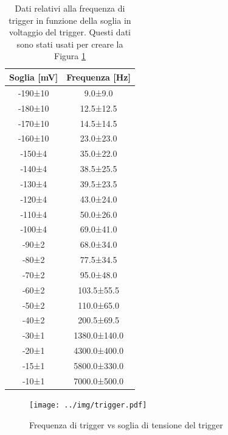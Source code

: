 \documentclass[10pt,a4paper]{article}
\begin{document}
\begin{table}[h]
    \centering
\begin{tabular}{c|c}
Soglia [mV] & Frequenza [Hz] \\
\midrule
-190±10 &      9.0±9.0 \\
-180±10 &    12.5±12.5 \\
-170±10 &    14.5±14.5 \\
-160±10 &    23.0±23.0 \\
 -150±4 &    35.0±22.0 \\
 -140±4 &    38.5±25.5 \\
 -130±4 &    39.5±23.5 \\
 -120±4 &    43.0±24.0 \\
 -110±4 &    50.0±26.0 \\
 -100±4 &    69.0±41.0 \\
  -90±2 &    68.0±34.0 \\
  -80±2 &    77.5±34.5 \\
  -70±2 &    95.0±48.0 \\
  -60±2 &   103.5±55.5 \\
  -50±2 &   110.0±65.0 \\
  -40±2 &   200.5±69.5 \\
  -30±1 & 1380.0±140.0 \\
  -20±1 & 4300.0±400.0 \\
  -15±1 & 5800.0±330.0 \\
  -10±1 & 7000.0±500.0 \\
\end{tabular}


    \caption{Dati relativi alla frequenza di trigger in funzione della soglia in voltaggio del trigger. Questi dati sono stati usati per creare la Figura \ref{fig:freq}}
    \label{tab:freq}
\end{table}

\begin{figure}[h]
    \centering
    \texttt{[image: ../img/trigger.pdf]}
    \caption{Frequenza di trigger vs soglia di tensione del trigger}
    \label{fig:freq}
\end{figure}
\end{document}
